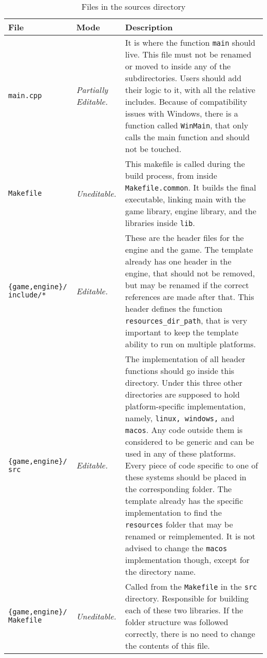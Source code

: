 \begin{longtabu} to \linewidth {XlX[2]}

\caption{Files in the sources directory}\label{tab:files_src_dir}\\
\toprule
\textbf{File} & \textbf{Mode} & \textbf{Description} \\
\midrule
\endhead

\texttt{main.cpp} & \textit{Partially Editable.} & It is where the function \texttt{main} should live. This file must not be renamed or moved to inside any of the subdirectories. Users should add their logic to it, with all the relative includes. Because of compatibility issues with Windows, there is a function called \texttt{WinMain}, that only calls the main function and should not be touched. \\ \hline
\texttt{Makefile} & \textit{Uneditable.} & This makefile is called during the build process, from inside \texttt{Makefile.common}. It builds the final executable, linking main with the game library, engine library, and the libraries inside \texttt{lib}. \\ \hline
\texttt{\{game,engine\}/ include/*} & \textit{Editable.} & These are the header files for the engine and the game. The template already has one header in the engine, that should not be removed, but may be renamed if the correct references are made after that. This header defines the function \texttt{resources\_dir\_path}, that is very important to keep the template ability to run on multiple platforms. \\ \hline
\texttt{\{game,engine\}/ src} & \textit{Editable.} & The implementation of all header functions should go inside this directory. Under this three other directories are supposed to hold platform-specific implementation, namely, \texttt{linux, windows,} and \texttt{macos}. Any code outside them is considered to be generic and can be used in any of these platforms. Every piece of code specific to one of these systems should be placed in the corresponding folder. The template already has the specific implementation to find the \texttt{resources} folder that may be renamed or reimplemented. It is not advised to change the \texttt{macos} implementation though, except for the directory name. \\ \hline
\texttt{\{game,engine\}/ Makefile} & \textit{Uneditable.} & Called from the \texttt{Makefile} in the \texttt{src} directory. Responsible for building each of these two libraries. If the folder structure was followed correctly, there is no need to change the contents of this file. \\

\bottomrule
\end{longtabu}



